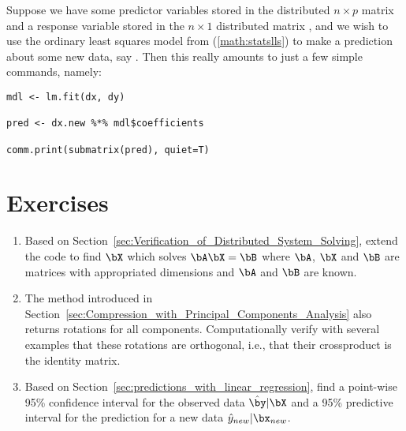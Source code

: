 Suppose we have some predictor variables stored in the distributed
$n\times p$ matrix  and a response variable stored
in the $n\times 1$ distributed matrix , and we wish to use the
ordinary least squares model from (\ref{math:statslls}) to make a
prediction about some new data, say . Then this really
amounts to just a few simple commands, namely:
\begin{lstlisting}[language=rr]
mdl <- lm.fit(dx, dy)

pred <- dx.new %*% mdl$coefficients

comm.print(submatrix(pred), quiet=T)
\end{lstlisting}




\section{Exercises}
\label{sec:dmatstats_exercise}

\begin{enumerate}[label=\thechapter-\arabic*]

\item
Based on Section~\ref{sec:Verification_of_Distributed_System_Solving},
extend the code to find $\bX$ which solves $\bA\bX = \bB$ where $\bA$, $\bX$ 
and $\bB$ are matrices with appropriated dimensions and $\bA$ and $\bB$ are 
known.

\item
The  method introduced in 
Section~\ref{sec:Compression_with_Principal_Components_Analysis}
also returns rotations for all components.  Computationally verify with 
several examples that these rotations are orthogonal, i.e., that their 
crossproduct is the identity matrix.

\item
Based on Section~\ref{sec:predictions_with_linear_regression}, find a point-wise
95\% confidence interval for the observed data $\hat{\by}|\bX$ and a 95\% 
predictive interval for the prediction for a new data $\hat{y}_{new}|\bx_{new}$.

\end{enumerate}
